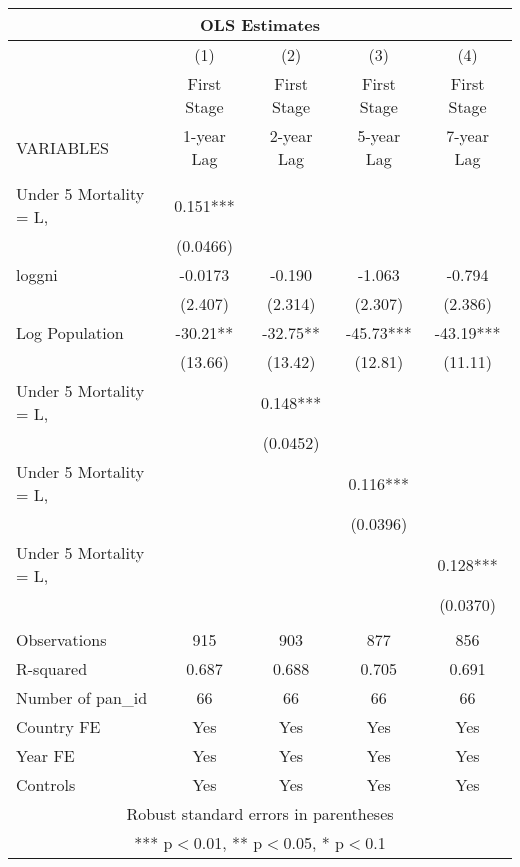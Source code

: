 \documentclass[]{article}
\begin{document}
\begin{tabular}{lcccc}
\multicolumn{5}{c}{OLS Estimates} \\ \hline
 & (1) & (2) & (3) & (4) \\
 & First Stage & First Stage & First Stage & First Stage \\
VARIABLES & 1-year Lag & 2-year Lag & 5-year Lag & 7-year Lag \\ \hline
 &  &  &  &  \\
Under 5 Mortality = L, & 0.151*** &  &  &  \\
 & (0.0466) &  &  &  \\
loggni & -0.0173 & -0.190 & -1.063 & -0.794 \\
 & (2.407) & (2.314) & (2.307) & (2.386) \\
Log Population & -30.21** & -32.75** & -45.73*** & -43.19*** \\
 & (13.66) & (13.42) & (12.81) & (11.11) \\
Under 5 Mortality = L, &  & 0.148*** &  &  \\
 &  & (0.0452) &  &  \\
Under 5 Mortality = L, &  &  & 0.116*** &  \\
 &  &  & (0.0396) &  \\
Under 5 Mortality = L, &  &  &  & 0.128*** \\
 &  &  &  & (0.0370) \\
 &  &  &  &  \\
Observations & 915 & 903 & 877 & 856 \\
R-squared & 0.687 & 0.688 & 0.705 & 0.691 \\
Number of pan\_id & 66 & 66 & 66 & 66 \\
Country FE & Yes & Yes & Yes & Yes \\
Year FE & Yes & Yes & Yes & Yes \\
 Controls & Yes & Yes & Yes & Yes \\ \hline
\multicolumn{5}{c}{ Robust standard errors in parentheses} \\
\multicolumn{5}{c}{ *** p$<$0.01, ** p$<$0.05, * p$<$0.1} \\
\end{tabular}
\end{document}
